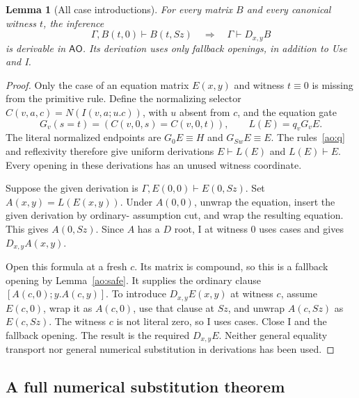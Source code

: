 \documentclass[11pt,letterpaper]{article}
\newtheorem{lemma}[theorem]{Lemma}
\theoremstyle{definition}
\begin{document}
\begin{lemma}[All case introductions]
\label{ao:all-case}
For every matrix $B$ and every canonical witness $t$, the inference
\[
       \Gamma,B(t,0)\vdash B(t,Sz)
       \quad\Longrightarrow\quad
       \Gamma\vdash D_{x,y}B
\]
is derivable in $\mathsf{AO}$.  Its derivation uses only fallback
openings, in addition to Use and I.
\end{lemma}
\begin{proof}
Only the case of an equation matrix $E(x,y)$ and witness $t\equiv0$
is missing from the primitive rule.  Define the normalizing selector
$C(v,a,c)=N(I(v,a;u.c))$, with $u$ absent from $c$, and the equation gate
\[
 G_v(s=t)=(C(v,0,s)=C(v,0,t)),\qquad L(E)=q_vG_vE.
\]
The literal normalized endpoints are $G_0E\equiv H$ and
$G_{Sw}E\equiv E$.  The rules~\eqref{ao:q} and reflexivity therefore
give uniform derivations $E\vdash L(E)$ and $L(E)\vdash E$.  Every
opening in these derivations has an unused witness coordinate.

Suppose the given derivation is
$\Gamma,E(0,0)\vdash E(0,Sz)$.  Set $A(x,y)=L(E(x,y))$.  Under
$A(0,0)$, unwrap the equation, insert the given derivation by ordinary-
assumption cut, and wrap the resulting equation.  This gives $A(0,Sz)$.
Since $A$ has a $D$ root, I at witness $0$ uses cases and gives
$D_{x,y}A(x,y)$.

Open this formula at a fresh $c$.  Its matrix is compound, so this is
a fallback opening by Lemma~\ref{ao:safe}.  It supplies the ordinary
clause $[A(c,0);y.A(c,y)]$.  To introduce $D_{x,y}E(x,y)$ at witness
$c$, assume $E(c,0)$, wrap it as $A(c,0)$, use that clause at $Sz$,
and unwrap $A(c,Sz)$ as $E(c,Sz)$.  The witness $c$ is not literal
zero, so I uses cases.  Close I and the fallback opening.  The result
is the required $D_{x,y}E$.  Neither general equality transport nor
general numerical substitution in derivations has been used.
\end{proof}

\subsection{A full numerical substitution theorem}
\end{document}
